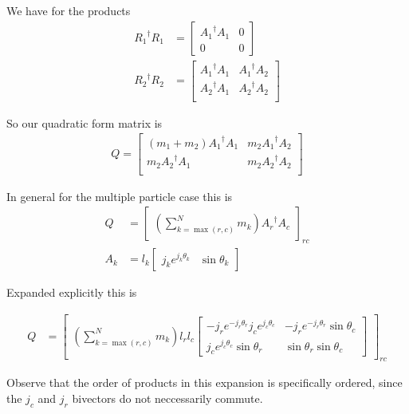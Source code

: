 We have for the products
\begin{align}\label{eqn:sPolarMultiPendulum:zoo14}
{R_1}^\dagger R_1 &=
\begin{bmatrix}
{A_1}^\dagger A_1 & 0 \\
0 & 0
\end{bmatrix} \\
{R_2}^\dagger R_2 &=
\begin{bmatrix}
{A_1}^\dagger A_1 & {A_1}^\dagger A_2 \\
{A_2}^\dagger A_1 & {A_2}^\dagger A_2 \\
\end{bmatrix} 
\end{align}

So our quadratic form matrix is
\begin{align}\label{eqn:sPolarMultiPendulum:zoo15}
Q =
\begin{bmatrix}
(m_1 + m_2) {A_1}^\dagger A_1 & m_2 {A_1}^\dagger A_2 \\
m_2 {A_2}^\dagger A_1 & m_2 {A_2}^\dagger A_2 \\
\end{bmatrix} 
\end{align}

In general for the multiple particle case this is
\begin{align}\label{eqn:sPolarMultiPendulum:zoo16}
Q &=
{\begin{bmatrix}
\left(\sum_{k=\max(r,c)}^N m_k \right)
{A_r}^\dagger A_c
\end{bmatrix}}_{rc} \\
A_k &= l_k 
\begin{bmatrix}
j_k e^{j_k \theta_k} & \sin\theta_k
\end{bmatrix}
\end{align}

Expanded explicitly this is

\begin{align}\label{eqn:sPolarMultiPendulum:zoo17}
Q &=
{\begin{bmatrix}
\left(\sum_{k=\max(r,c)}^N m_k \right) l_r l_c
\begin{bmatrix}
- j_r e^{-j_r \theta_r} j_c e^{j_c\theta_c} & - j_r e^{-j_r \theta_r} \sin\theta_c \\
j_c e^{j_c \theta_c} \sin\theta_r & \sin\theta_r \sin\theta_c
\end{bmatrix}
\end{bmatrix}}_{rc}
\end{align}

Observe that the order of products in this expansion is specifically ordered, since the $j_c$ and $j_r$ bivectors do not neccessarily commute.

